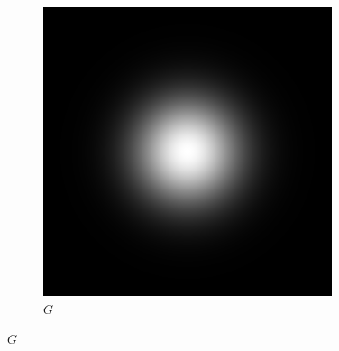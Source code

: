 \documentclass[thesis.tex]{subfiles}
\begin{document}
\begin{figure}[p]
	\begin{subfigure}[t]{0.23\textwidth}
		\includegraphics[width=\textwidth]{img/gaussianDerivative_0_0.png}
		\caption*{$G$}
	\end{subfigure}
	\vspace{2mm}	
	

\end{figure}
\end{document}
